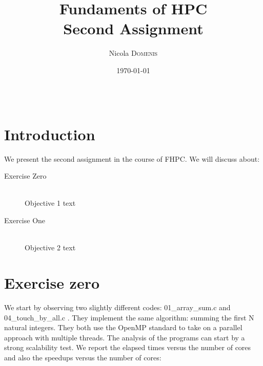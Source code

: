 \documentclass{article}
\title{Fundaments of HPC \\ Second Assignment} %
\author{Nicola \textsc{Domenis}} %
\date{\today} %
\begin{document}
\maketitle %

\begin{center}
\begin{tabular}{l r}

\end{tabular}
\end{center}



\section{Introduction}

We present the second assignment in the course of FHPC. We will discuss about:


\begin{description}
\item[Exercise Zero] \hfill \\
Objective 1 text
\item[Exercise One] \hfill \\
Objective 2 text
\end{description} 
 

\section{Exercise zero}

We start by observing two slightly different codes: 01\_array\_sum.c
and 04\_touch\_by\_all.c . They implement the same algorithm: summing the first N natural integers. They both use the OpenMP standard to take on a parallel approach with multiple threads.
The analysis of the programs can start by a strong scalability test.
We report the elapsed times versus the number of cores and also the speedups versus the number of cores:
\end{document}
